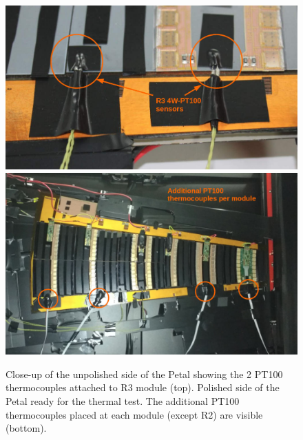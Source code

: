 		\begin{figure}[H]
			\centering
			\captionsetup{justification=centering,margin=2cm}
			\includegraphics[scale=0.47]{Figures/Chapter02/R3PT100CloseUp.jpg}
			\includegraphics[scale=0.45]{Figures/Chapter02/AdditionalPT100perModule.jpg}
			\caption{Close-up of the unpolished side of the Petal showing the 2 PT100 thermocouples attached to R3 module (top). Polished side of the Petal ready for the thermal test. The additional PT100 thermocouples placed at each module (except R2) are visible (bottom).}\label{fig2.9}
		\end{figure}
